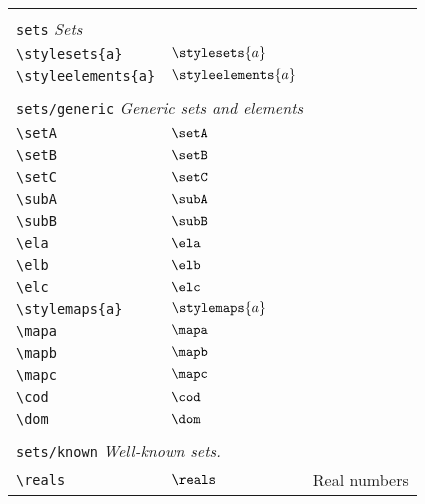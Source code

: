 \begin{longtable}{lll}
 &  & \\ 
 \multicolumn{3}{l}{{\color[rgb]{0.5,0.5,0.5}\texttt{sets}} \emph{Sets}}\\ 
 \hline
\hline
{\color[rgb]{0.5,0.5,0.5}\texttt{\textbackslash stylesets\{a\}}} & $\stylesets{a}$ & \\ 
 {\color[rgb]{0.5,0.5,0.5}\texttt{\textbackslash styleelements\{a\}}} & $\styleelements{a}$ & \\ 
  &  & \\ 
 \multicolumn{3}{l}{{\color[rgb]{0.5,0.5,0.5}\texttt{sets/generic}} \emph{Generic sets and elements}}\\ 
 \hline
{\color[rgb]{0.5,0.5,0.5}\texttt{\textbackslash setA}} & $\setA$ & \\ 
 {\color[rgb]{0.5,0.5,0.5}\texttt{\textbackslash setB}} & $\setB$ & \\ 
 {\color[rgb]{0.5,0.5,0.5}\texttt{\textbackslash setC}} & $\setC$ & \\ 
 {\color[rgb]{0.5,0.5,0.5}\texttt{\textbackslash subA}} & $\subA$ & \\ 
 {\color[rgb]{0.5,0.5,0.5}\texttt{\textbackslash subB}} & $\subB$ & \\ 
 {\color[rgb]{0.5,0.5,0.5}\texttt{\textbackslash ela}} & $\ela$ & \\ 
 {\color[rgb]{0.5,0.5,0.5}\texttt{\textbackslash elb}} & $\elb$ & \\ 
 {\color[rgb]{0.5,0.5,0.5}\texttt{\textbackslash elc}} & $\elc$ & \\ 
 {\color[rgb]{0.5,0.5,0.5}\texttt{\textbackslash stylemaps\{a\}}} & $\stylemaps{a}$ & \\ 
 {\color[rgb]{0.5,0.5,0.5}\texttt{\textbackslash mapa}} & $\mapa$ & \\ 
 {\color[rgb]{0.5,0.5,0.5}\texttt{\textbackslash mapb}} & $\mapb$ & \\ 
 {\color[rgb]{0.5,0.5,0.5}\texttt{\textbackslash mapc}} & $\mapc$ & \\ 
 {\color[rgb]{0.5,0.5,0.5}\texttt{\textbackslash cod}} & $\cod$ & \\ 
 {\color[rgb]{0.5,0.5,0.5}\texttt{\textbackslash dom}} & $\dom$ & \\ 
  &  & \\ 
 \multicolumn{3}{l}{{\color[rgb]{0.5,0.5,0.5}\texttt{sets/known}} \emph{Well-known sets.}}\\ 
 \hline
{\color[rgb]{0.5,0.5,0.5}\texttt{\textbackslash reals}} & $\reals$ &  Real numbers\\ 

\end{longtable}
